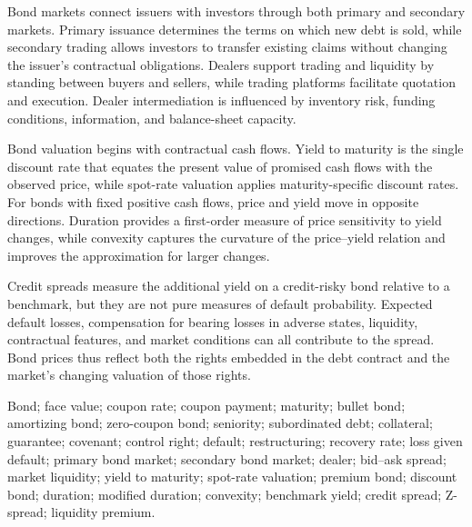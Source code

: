 Bond markets connect issuers with investors through both primary and secondary markets. Primary issuance determines the terms on which new debt is sold, while secondary trading allows investors to transfer existing claims without changing the issuer's contractual obligations. Dealers support trading and liquidity by standing between buyers and sellers, while trading platforms facilitate quotation and execution. Dealer intermediation is influenced by inventory risk, funding conditions, information, and balance-sheet capacity.

Bond valuation begins with contractual cash flows. Yield to maturity is the single discount rate that equates the present value of promised cash flows with the observed price, while spot-rate valuation applies maturity-specific discount rates. For bonds with fixed positive cash flows, price and yield move in opposite directions. Duration provides a first-order measure of price sensitivity to yield changes, while convexity captures the curvature of the price--yield relation and improves the approximation for larger changes.

Credit spreads measure the additional yield on a credit-risky bond relative to a benchmark, but they are not pure measures of default probability. Expected default losses, compensation for bearing losses in adverse states, liquidity, contractual features, and market conditions can all contribute to the spread. Bond prices thus reflect both the rights embedded in the debt contract and the market's changing valuation of those rights.



Bond; face value; coupon rate; coupon payment; maturity; bullet bond; amortizing bond; zero-coupon bond; seniority; subordinated debt; collateral; guarantee; covenant; control right; default; restructuring; recovery rate; loss given default; primary bond market; secondary bond market; dealer; bid--ask spread; market liquidity; yield to maturity; spot-rate valuation; premium bond; discount bond; duration; modified duration; convexity; benchmark yield; credit spread; Z-spread; liquidity premium.




